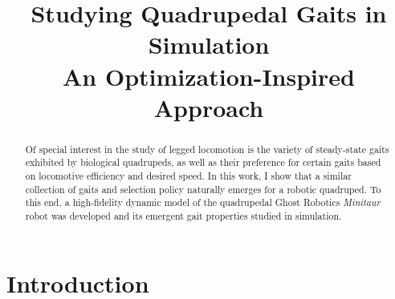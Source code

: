 \documentclass[conference,11pt,letterpaper]{IEEEtran}
\begin{document}
%
\title{\LARGE Studying Quadrupedal Gaits in Simulation\\\Large An Optimization-Inspired Approach}

\author{
}

\maketitle

\begin{abstract}

Of special interest in the study of legged locomotion is the variety of steady-state gaits exhibited by biological quadrupeds, as well as their preference for certain gaits based on locomotive efficiency and desired speed. In this work, I show that a similar collection of gaits and selection policy naturally emerges for a robotic quadruped. To this end, a high-fidelity dynamic model of the quadrupedal Ghost Robotics \emph{Minitaur} robot was developed and its emergent gait properties studied in simulation.
\end{abstract}

\section{Introduction}

\end{document}
